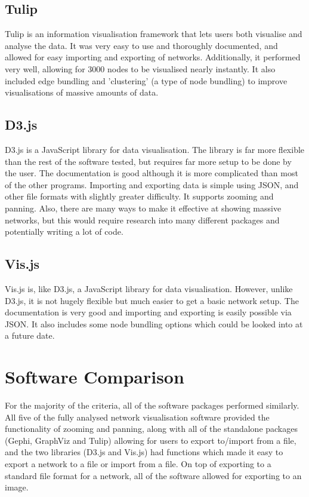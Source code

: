 \documentclass[../dissertation.tex]{subfiles}
\begin{document}
\subsection{Tulip}

Tulip is an information visualisation framework that lets users both visualise and analyse the data. It was very easy to use and thoroughly documented, and allowed for easy importing and exporting of networks. Additionally, it performed very well, allowing for 3000 nodes to be visualised nearly instantly. It also included edge bundling and 'clustering' (a type of node bundling) to improve visualisations of massive amounts of data.

\subsection{D3.js}

D3.js is a JavaScript library for data visualisation. The library is far more flexible than the rest of the software tested, but requires far more setup to be done by the user. The documentation is good although it is more complicated than most of the other programs. Importing and exporting data is simple using JSON, and other file formats with slightly greater difficulty. It supports zooming and panning. Also, there are many ways to make it effective at showing massive networks, but this would require research into many different packages and potentially writing a lot of code.

\subsection{Vis.js}

Vis.js is, like D3.js, a JavaScript library for data visualisation. However, unlike D3.js, it is not hugely flexible but much easier to get a basic network setup. The documentation is very good and importing and exporting is easily possible via JSON. It also includes some node bundling options which could be looked into at a future date.

\section{Software Comparison}

For the majority of the criteria, all of the software packages performed similarly. All five of the fully analysed network visualisation software provided the functionality of zooming and panning, along with all of the standalone packages (Gephi, GraphViz and Tulip) allowing for users to export to/import from a file, and the two libraries (D3.js and Vis.js) had functions which made it easy to export a network to a file or import from a file. On top of exporting to a standard file format for a network, all of the software allowed for exporting to an image.
\end{document}
